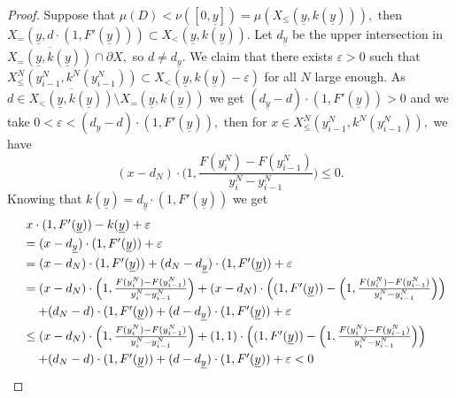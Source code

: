\documentclass[12pt,reqno]{amsart}
\begin{document}
\begin{proof}
Suppose that $\mu(D)<\nu([0,\underline{y}])=\mu(X_\le(\underline{y},k(\underline{y}))),$ then $X_=(\underline{y},d\cdot(1,F'(\underline{y})))\subset X_<(\underline{y},k(\underline{y})).$ Let $d_{\underline{y}}$ be the upper intersection in $\overline{X_=(\underline{y},k(\underline{y}))}\cap \partial X,$ so $d\neq d_{\underline{y}}.$ We claim that there exists $\varepsilon>0$ such that $X^N_\le(y_{i-1}^N,k^N(y_{i-1}^N))\subset X_<(\underline{y},k(\underline{y})-\varepsilon)$ for all $N$ large enough. As $d\in \overline{X_<(\underline{y},k(\underline{y}))}\setminus X_=(\underline{y},k(\underline{y}))$ we get $(d_{\underline{y}}-d)\cdot(1,F'(\underline{y}))>0$ and we  take $0<\varepsilon<(d_{\underline{y}}-d)\cdot(1,F'(\underline{y})),$ then for $x\in X^N_\le(y_{i-1}^N,k^N(y_{i-1}^N)),$ we have 
\[(x-d_N)\cdot\Big(1,\frac{F(y_{i}^N)-F(y_{i-1}^N)}{y_{i}^N-y_{i-1}^N}\Big)\le0.\]
Knowing that $k(\underline{y})=d_{\underline{y}}\cdot(1,F'(\underline{y}))$ we get
\[\begin{array}{ll}\hspace{-0.2cm}
&x\cdot(1,F'(\underline{y}))-k(\underline{y})+\varepsilon\vspace{3pt}\\
&=(x-d_{\underline{y}})\cdot (1,F'(\underline{y}))+\varepsilon \vspace{3pt}\\
&=(x-d_N)\cdot(1,F'(\underline{y}))+(d_N-d_{\underline{y}})\cdot(1,F'(\underline{y}))+\varepsilon\vspace{3pt}\\
&=(x-d_N)\cdot\Big(1,\frac{F(y_{i}^N)-F(y_{i-1}^N)}{y_{i}^N-y_{i-1}^N}\Big)+(x-d_N)\cdot\Big((1,F'(\underline{y}))
-\Big(1,\frac{F(y_{i}^N)-F(y_{i-1}^N)}{y_{i}^N-y_{i-1}^N}\Big)\Big)\vspace{3pt}\\
&\quad +(d_N-d)\cdot(1,F'(\underline{y}))+(d-d_{\underline{y}})\cdot(1,F'(\underline{y}))+\varepsilon\vspace{3pt}\\
&\le (x-d_N)\cdot\Big(1,\frac{F(y_{i}^N)-F(y_{i-1}^N)}{y_{i}^N-y_{i-1}^N}\Big)+(1,1)\cdot\Big((1,F'(\underline{y}))
-\Big(1,\frac{F(y_{i}^N)-F(y_{i-1}^N)}{y_{i}^N-y_{i-1}^N}\Big)\Big)\vspace{3pt}\\
&\quad+(d_N-d)\cdot(1,F'(\underline{y}))+(d-d_{\underline{y}})\cdot(1,F'(\underline{y}))+\varepsilon<0
\end{array}\]


\end{proof}
\end{document}
